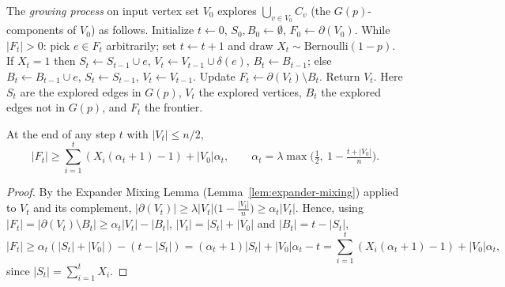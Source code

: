 \begin{lemma}
  \label{alg:growing}
  The \emph{growing process} on input vertex set $V_0$ explores
  $\bigcup_{v \in V_0} C_v$ (the $G(p)$-components of $V_0$) as follows.
  Initialize $t \leftarrow 0$, $S_0, B_0 \leftarrow \emptyset$,
  $F_0 \leftarrow \partial(V_0)$. While $|F_t| > 0$: pick $e \in F_t$
  arbitrarily; set $t \leftarrow t+1$ and draw $X_t \sim \mathrm{Bernoulli}(1-p)$.
  If $X_t = 1$ then $S_t \leftarrow S_{t-1} \cup e$,
  $V_t \leftarrow V_{t-1} \cup \delta(e)$, $B_t \leftarrow B_{t-1}$; else
  $B_t \leftarrow B_{t-1}\cup e$, $S_t \leftarrow S_{t-1}$,
  $V_t \leftarrow V_{t-1}$. Update $F_t \leftarrow \partial(V_t) \setminus B_t$.
  Return $V_t$. Here $S_t$ are the explored edges in $G(p)$, $V_t$ the explored
  vertices, $B_t$ the explored edges not in $G(p)$, and $F_t$ the frontier.
\end{lemma}

\begin{lemma}
  \label{lem:claim-frontier}
  At the end of any step $t$ with $|V_t| \le n/2$,
  \[
    |F_t| \ge \sum_{i=1}^t (X_i(\alpha_t + 1) - 1) + |V_0|\alpha_t,
    \qquad \alpha_t = \lambda \max\!\Big(\tfrac12,\ 1 - \tfrac{t+|V_0|}{n}\Big).
  \]
\end{lemma}
\begin{proof}
  By the Expander Mixing Lemma (Lemma~\ref{lem:expander-mixing}) applied to
  $V_t$ and its complement,
  $|\partial(V_t)| \ge \lambda|V_t|\big(1 - \tfrac{|V_t|}{n}\big) \ge \alpha_t|V_t|$.
  Hence, using $|F_t| = |\partial(V_t)\setminus B_t| \ge \alpha_t|V_t| - |B_t|$,
  $|V_t| = |S_t| + |V_0|$ and $|B_t| = t - |S_t|$,
  \[
    |F_t| \ge \alpha_t(|S_t| + |V_0|) - (t - |S_t|)
      = (\alpha_t + 1)|S_t| + |V_0|\alpha_t - t
      = \sum_{i=1}^t (X_i(\alpha_t+1) - 1) + |V_0|\alpha_t,
  \]
  since $|S_t| = \sum_{i=1}^t X_i$.
\end{proof}

